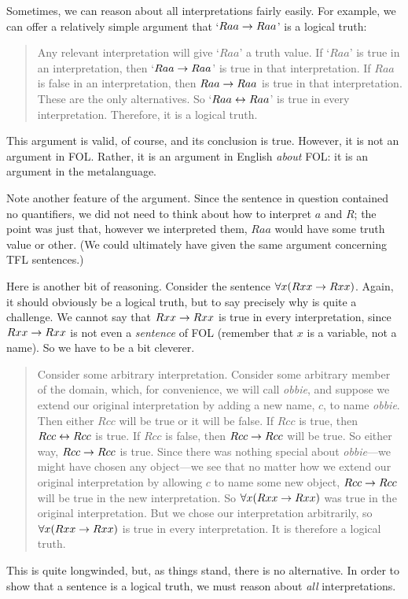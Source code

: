 Sometimes, we can reason about all interpretations fairly easily. For example, we can offer a relatively simple argument that `$Raa\rightarrow Raa$' is a logical truth:
	\begin{quote}
		\label{allmodels1}
		Any relevant interpretation will give `$Raa$' a truth value. If `$Raa$' is true in an interpretation, then `$Raa \rightarrow Raa$' is true in that interpretation. If $Raa$ is false in an interpretation, then $Raa \rightarrow Raa$ is true in that interpretation. These are the only alternatives. So `$Raa \leftrightarrow Raa$' is true in every interpretation. Therefore, it is a logical truth.
	\end{quote}
This argument is valid, of course, and its conclusion is true. However, it is not an argument in FOL. Rather, it is an argument in English \emph{about} FOL: it is an argument in the metalanguage.

Note another feature of the argument. Since the sentence in question contained no quantifiers, we did not need to think about how to interpret $a$ and $R$; the point was just that, however we interpreted them, $Raa$ would have some truth value or other. (We could ultimately have given the same argument concerning TFL sentences.)

Here is another bit of reasoning. Consider the sentence $\forall x(Rxx\rightarrow Rxx)$. Again, it should obviously be a logical truth, but to say precisely why is quite a challenge. We cannot say that $Rxx \rightarrow Rxx$ is true in every interpretation, since $Rxx \rightarrow Rxx$ is not even a \emph{sentence} of FOL (remember that $x$ is a variable, not a name). So we have to be a bit cleverer.
	\begin{quote}
		Consider some arbitrary interpretation. Consider some arbitrary member of the domain, which, for convenience, we will call \emph{obbie}, and suppose we extend our original interpretation by adding a new name, $c$, to name \emph{obbie}. Then either $Rcc$ will be true or it will be false. If $Rcc$ is true, then $Rcc \leftrightarrow Rcc$ is true. If $Rcc$ is false, then $Rcc \rightarrow Rcc$ will be true. So either way, $Rcc \rightarrow Rcc$ is true. Since there was nothing special about \emph{obbie}---we might have chosen any object---we see that no matter how we extend our original interpretation by allowing $c$ to name some new object, $Rcc \rightarrow Rcc$ will be true in the new interpretation. So $\forall x (Rxx \rightarrow Rxx)$ was true in the original interpretation. But we chose our interpretation arbitrarily, so $\forall x (Rxx \rightarrow Rxx)$ is true in every interpretation. It is therefore a logical truth.
	\end{quote}
This is quite longwinded, but, as things stand, there is no alternative. In order to show that a sentence is a logical truth, we must reason about \emph{all} interpretations.

